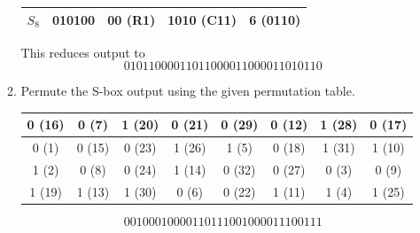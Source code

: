 \documentclass[12pt]{article}
\newenvironment{answer}
{ \begin{tcolorbox}[halign=left]
    }
    {  
  \end{tcolorbox}
}
\begin{document}
\begin{enumerate}
\begin{enumerate}
\begin{answer}
\begin{center}
\begin{tabular}{|c|c|c|c|c|}
            \hline
            $S_8$ & 010100 & 00 (R1) & 1010 (C11) & 6 (0110) \\
            \hline
        \end{tabular}
      \end{center}
      This reduces output to 
      \[ 0101 1000 0110 1100 
        0011 0000 1101 0110 \]
      \end{answer}
\newpage
    \item Permute the S-box output using the given permutation table.
      \begin{answer}
        \begin{center}
          \begin{tabular}{|c|c|c|c|c|c|c|c|}
            \hline
            0 (16) & 0 (7) & 1 (20) & 0 (21) & 0 (29) & 0 (12) & 1 (28) & 0 (17) \\
            \hline
            0 (1) & 0 (15) & 0 (23) & 1 (26) & 1 (5) & 0 (18) & 1 (31) & 1 (10) \\
            \hline
            1 (2) & 0 (8) & 0 (24) & 1 (14) & 0 (32) & 0 (27) & 0 (3) & 0 (9) \\
            \hline
            1 (19) & 1 (13) & 1 (30) & 0 (6) & 0 (22) & 1 (11) & 1 (4) & 1 (25) \\
            \hline            
          \end{tabular}
        \end{center}
        \[ 0010 0010 0001 1011 1001 0000 1110 0111 \]
      \end{answer}
  
    \end{enumerate}


\end{enumerate}
\end{document}
